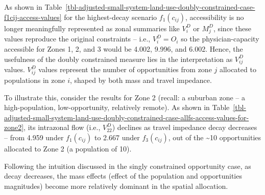 \documentclass[
  10pt,
  letterpaper,
]{article}
\begin{document}
As shown in
Table~\ref{tbl-adjusted-small-system-land-use-doubly-constrained-case-f1cij-access-values}
for the highest-decay scenario \(f_1(c_{ij})\), accessibility is no
longer meaningfully represented as zonal summaries like \(V^D_i\) or
\(M^D_j\), since these values reproduce the original constraints --
i.e., \(V^D_i = O_i\) so the physician-capacity accessible for Zones 1,
2, and 3 would be 4.002, 9.996, and 6.002. Hence, the usefulness of the
doubly constrained measure lies in the interpretation as \(V_{ij}^D\)
values. \(V^D_{ij}\) values represent the number of opportunities from
zone \(j\) allocated to populations in zone \(i\), shaped by both mass
and travel impedance.

To illustrate this, consider the results for Zone 2 (recall: a suburban
zone -- a high-population, low-opportunity, relatively remote). As shown
in
Table~\ref{tbl-adjusted-small-system-land-use-doubly-constrained-case-allfs-access-values-for-zone2},
its intrazonal flow (i.e., \(V^D_{22}\)) declines as travel impedance
decay decreases -- from 4.959 under \(f_1(c_{ij})\) to 2.667 under
\(f_3(c_{ij})\), out of the \textasciitilde10 opportunities allocated to
Zone 2 (a population of 10).

Following the intuition discussed in the singly constrained opportunity
case, as decay decreases, the mass effects (effect of the population and
opportunities magnitudes) become more relatively dominant in the spatial
allocation.
\end{document}
